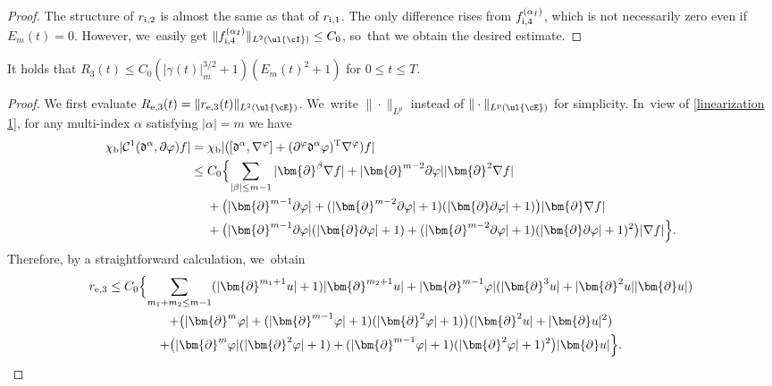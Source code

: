 \begin{proof}
The structure of $r_{{\rm i},2}$ is almost the same as that of $r_{{\rm i},1}$.
The only difference rises from $f_{{\rm i},4}^{(\alpha_I)}$, which is not necessarily zero even if $E_m(t)=0$.
However, we~easily get $\|f_{{\rm i},4}^{(\alpha_I)}\|_{L^2(\ul{\cI})} \leq C_0$, so~that we obtain the desired estimate.
\end{proof}

\begin{lemma}\label{lem:EstR3}
It holds that $R_3(t) \leq C_0(|\gamma(t)|_m^{3/2}+1)(E_m(t)^2+1)$ for $0\leq t\leq T$.
\end{lemma}

\begin{proof}
We first evaluate $R_{{\rm e},3}(t)=\|r_{{\rm e},3}(t)\|_{L^2(\ul{\cE})}$. We~write $\|\cdot\|_{L^p}$ instead of $\|\cdot\|_{L^p(\ul{\cE})}$ for simplicity. In~view of \eqref{linearization 1}, for any multi-index $\alpha$ satisfying $|\alpha|=m$ we have
\begin{align*}
\chi_\mathrm{b}|{\mathcal C}^1(\mathfrak{d}^\alpha,\partial \varphi)f|
&= \chi_\mathrm{b}|([\mathfrak{d}^\alpha,\nabla^\varphi]+(\partial^\varphi\mathfrak{d}^\alpha\varphi)^{\rm T}\nabla^\varphi)f| \\
&\leq C_0 \Bigl\{ \sum_{|\beta|\leq m-1}|\bm{\partial}^\beta\nabla f| + |\bm{\partial}^{m-2}\partial\varphi||\bm{\partial}^2\nabla f| \\
&\quad\;
+ \bigl(|\bm{\partial}^{m-1}\partial\varphi| + (|\bm{\partial}^{m-2}\partial\varphi|+1)(|\bm{\partial}\partial\varphi|+1) \bigr)|\bm{\partial}\nabla f| \\
&\quad\;
+ \bigl(|\bm{\partial}^{m-1}\partial\varphi|(|\bm{\partial}\partial\varphi|+1)
+ (|\bm{\partial}^{m-2}\partial\varphi|+1)(|\bm{\partial}\partial\varphi|+1)^2 \bigr) |\nabla f| \Bigr\}.
\end{align*}
Therefore, by a straightforward calculation, we~obtain
\begin{multline*}
r_{{\rm e},3}
\leq C_0 \Bigl\{ \sum_{m_1+m_2\leq m-1}(|\bm{\partial}^{m_1+1}u|+1)|\bm{\partial}^{m_2+1}u|
+ |\bm{\partial}^{m-1}\varphi|(|\bm{\partial}^3u| + |\bm{\partial}^2u||\bm{\partial}u|) \\
+ \bigl(|\bm{\partial}^m\varphi| + (|\bm{\partial}^{m-1}\varphi|+1)(|\bm{\partial}^2\varphi|+1) \bigr)(|\bm{\partial}^2u|+|\bm{\partial}u|^2) \\
+ \bigl(|\bm{\partial}^m\varphi|(|\bm{\partial}^2\varphi|+1) + (|\bm{\partial}^{m-1}\varphi|+1)(|\bm{\partial}^2\varphi|+1)^2 \bigr) |\bm{\partial}u| \Bigr\}.
\end{multline*}


\end{proof}
